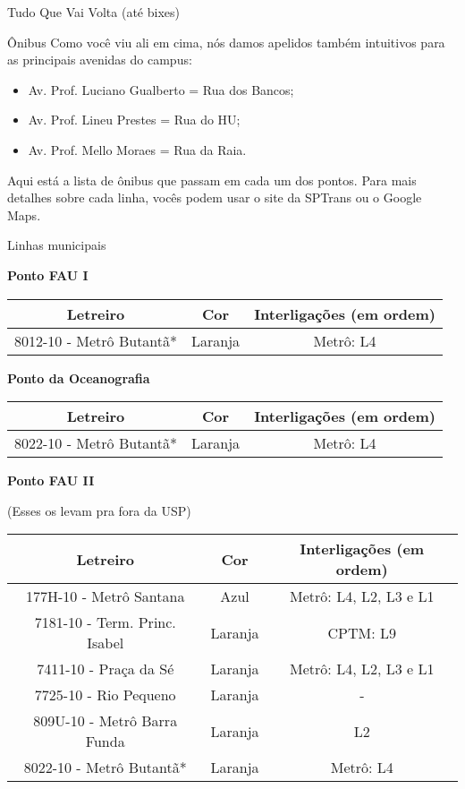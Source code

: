 \begin{secao}{Tudo Que Vai Volta (até bixes)}
\begin{subsecao}{Ônibus}
Como você viu ali em cima, nós damos apelidos também intuitivos para as principais
avenidas do campus:
\begin{itemize}
	\item Av. Prof. Luciano Gualberto = Rua dos Bancos;
	\item Av. Prof. Lineu Prestes = Rua do HU;
	\item Av. Prof. Mello Moraes = Rua da Raia.
\end{itemize}

Aqui está a lista de ônibus que passam em cada um dos pontos. Para mais detalhes
sobre cada linha, vocês podem usar o site da SPTrans ou o Google Maps.

\begin{subsubsecao}{Linhas municipais}

{\bf Ponto FAU I}

\begin{center}
	\begin{tabular}{|c|c|c|}
      \hline
	  Letreiro & Cor & Interligações (em ordem)\\
	  \hline
	  8012-10 - Metrô Butantã* & Laranja & Metrô: L4\\
      \hline
	\end{tabular}
\end{center}

{\bf Ponto da Oceanografia}

\begin{center}
	\begin{tabular}{|c|c|c|}
      \hline
	  Letreiro & Cor & Interligações (em ordem)\\
	  \hline
	  8022-10 - Metrô Butantã* & Laranja & Metrô: L4\\
      \hline
	\end{tabular}
\end{center}

{\bf Ponto FAU II}

(Esses os levam pra fora da USP)
\begin{center}
	\begin{tabular}{|c|c|c|}
      \hline
	  Letreiro & Cor & Interligações (em ordem)\\
	  \hline
	  177H-10 - Metrô Santana & Azul & Metrô: L4, L2, L3 e L1\\
	  7181-10 - Term. Princ. Isabel & Laranja & CPTM: L9\\
	  7411-10 - Praça da Sé & Laranja & Metrô: L4, L2, L3 e L1\\
	  7725-10 - Rio Pequeno & Laranja & - \\
	  809U-10 - Metrô Barra Funda & Laranja & L2 \\
	  8022-10 - Metrô Butantã* & Laranja & Metrô: L4\\
      \hline
	\end{tabular}
\end{center}


\end{subsubsecao}
\end{subsecao}
\end{secao}
